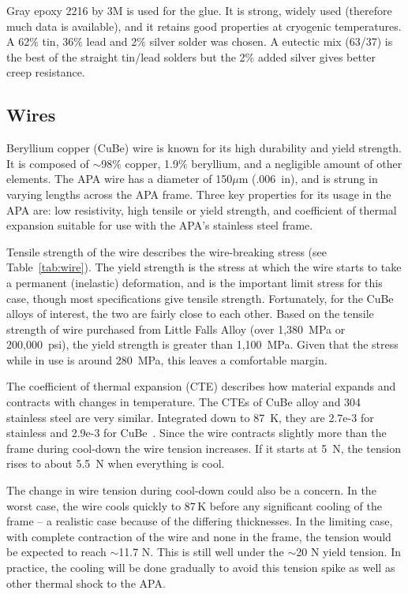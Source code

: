 Gray epoxy 2216 by 3M is used for the glue.  It is strong, widely used (therefore much data is available), and it retains good properties at cryogenic temperatures.  A 62$\%$ tin, 36$\%$ lead and 2$\%$ silver solder was chosen.  A eutectic mix (63/37) is the best of the straight tin/lead solders but the 2$\%$ added silver gives better creep resistance.

\subsection{Wires}
\label{sec:fdsp-apa-wires}

Beryllium copper (CuBe) wire is known for its high durability and yield strength. It is composed of $\sim$98$\%$ copper, 1.9$\%$ beryllium, and a negligible amount of other elements. The APA wire has a diameter of 150$\mu$m (.006~in), and is strung in varying lengths across the APA frame. Three key properties for its usage in the APA are: low resistivity, high tensile or yield strength, and coefficient of thermal expansion suitable for use with the APA's stainless steel frame.

Tensile strength of the wire describes the wire-breaking stress (see Table~\ref{tab:wire}).  The yield strength is the stress at which the wire starts to take a permanent (inelastic) deformation, and is the important limit stress for this case, though most specifications give tensile strength.  Fortunately, for the CuBe alloys of interest, the two are fairly close to each other.  Based on the tensile strength of wire purchased from Little Falls Alloy (over 1,380~MPa or 200,000~psi), the yield strength is greater than 1,100~MPa.  Given that the stress while in use is around 280~MPa, this leaves a comfortable margin.

The coefficient of thermal expansion (CTE) describes how material expands and contracts with changes in temperature.  The CTEs of CuBe alloy and 304 stainless steel are very similar.  Integrated down to 87~K, they are 2.7e-3 for stainless and 2.9e-3 for CuBe~\cite{cryo-mat-db}.
Since the wire contracts slightly more than the frame during cool-down the wire tension increases.  If it starts at 5~N, the tension rises to about 5.5~N when everything is cool.  

The change in wire tension during cool-down could also be a concern.  In the worst case, the wire
 cools quickly to 87\,K before any significant cooling of the frame  -- a realistic case because of the differing thicknesses.  In the limiting case, with complete contraction of the wire and none in the frame, the tension would be expected to reach $\sim$11.7 N.  This is still well under the $\sim$20 N yield tension.
In practice, the cooling will be done gradually to avoid this tension spike as well as other thermal shock to the APA.

